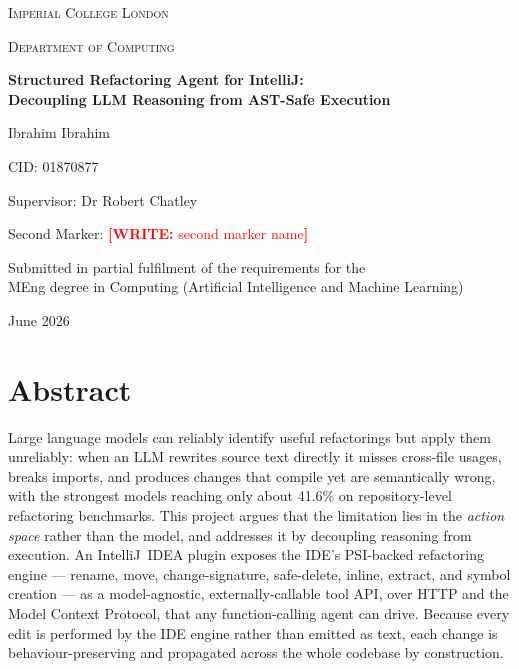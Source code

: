 \documentclass[11pt,a4paper]{report}
\newcommand{\writeme}[1]{\textcolor{red}{\textbf{[WRITE:} #1\textbf{]}}}
\newcommand{\reporttitle}{Structured Refactoring Agent for IntelliJ:\\Decoupling LLM Reasoning from AST-Safe Execution}
\newcommand{\reportauthor}{Ibrahim Ibrahim}
\newcommand{\supervisorname}{Dr Robert Chatley}
\newcommand{\secondmarkername}{\writeme{second marker name}}
\newcommand{\reportdate}{June 2026}
\begin{document}
\begin{titlepage}
  \centering
  \vspace*{1cm}
  {\scshape\LARGE Imperial College London \par}
  \vspace{0.3cm}
  {\scshape\large Department of Computing \par}
  \vspace{2.5cm}
  {\huge\bfseries \reporttitle \par}
  \vspace{2.5cm}
  {\Large \reportauthor \par}
  \vspace{0.2cm}
  {\large CID: 01870877 \par}
  \vspace{1cm}
  {\large Supervisor: \supervisorname \par}
  {\large Second Marker: \secondmarkername \par}
  \vfill
  {\large Submitted in partial fulfilment of the requirements for the\\
   MEng degree in Computing (Artificial Intelligence and Machine Learning)\par}
  \vspace{1cm}
  {\large \reportdate \par}
\end{titlepage}

\chapter*{Abstract}
Large language models can reliably identify useful refactorings but apply them
unreliably: when an LLM rewrites source text directly it misses cross-file usages,
breaks imports, and produces changes that compile yet are semantically wrong, with the
strongest models reaching only about 41.6\% on repository-level refactoring benchmarks.
This project argues that the limitation lies in the \emph{action space} rather than the
model, and addresses it by decoupling reasoning from execution. An IntelliJ~IDEA plugin
exposes the IDE's PSI-backed refactoring engine --- rename, move, change-signature,
safe-delete, inline, extract, and symbol creation --- as a model-agnostic,
externally-callable tool API, over HTTP and the Model Context Protocol, that any
function-calling agent can drive. Because every edit is performed by the IDE engine
rather than emitted as text, each change is behaviour-preserving and propagated across
the whole codebase by construction.
\end{document}
